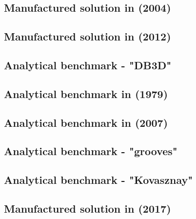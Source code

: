 \subsection{Manufactured solution in \textcite{dobo04} (2004) \label{ss:mms2}}


\subsection{Manufactured solution in \textcite{tesk12} (2012) \label{ss:mms_tesk12}}


\subsection{Analytical benchmark \label{mms_db3D} - "DB3D"}


\subsection{Analytical benchmark in \textcite{been79} (1979) \label{mms4}}


\subsection{Analytical benchmark in \textcite{ilpe07} (2007) \label{mms6}}


\subsection{Analytical benchmark \label{mms7} - "grooves"}


\subsection{Analytical benchmark \label{mms8} - "Kovasznay"}


\subsection{Manufactured solution in \textcite{lami17} (2017) \label{ss:mms11}}


